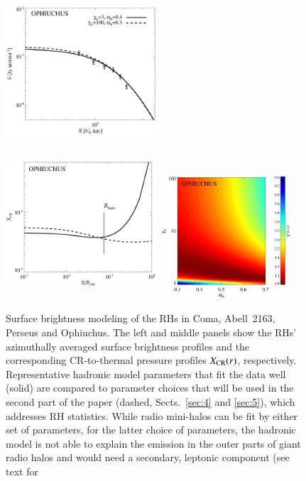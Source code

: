 \documentclass[useAMS,usenatbib]{mn2e}
\begin{document}
\begin{figure}
\includegraphics[width=5.6cm,height=5.6cm,keepaspectratio]{figures/SB_Ophiuchus.eps}
\includegraphics[width=5.6cm,height=5.6cm,keepaspectratio]{figures/XCR_Ophiuchus.eps}
\includegraphics[width=5cm,height=4.6cm]{figures/ProbOphiuchus.eps}
%
\caption{Surface brightness modeling of the RHs in Coma, Abell~2163, Perseus and
  Ophiuchus. The left and middle panels show the RHs' azimuthally averaged
  surface brightness profiles and the corresponding CR-to-thermal pressure
  profiles $X_{{\mathrm{CR}}}(r)$, respectively. Representative hadronic model
  parameters that fit the data well (solid) are compared to parameter choices
  that will be used in the second part of the paper (dashed, Sects.~\ref{sec:4}
  and \ref{sec:5}), which addresses RH statistics. While radio mini-halos can be
  fit by either set of parameters, for the latter choice of parameters, the
  hadronic model is not able to explain the emission in the outer parts of giant
  radio halos and would need a secondary, leptonic component (see text for
}
\end{figure}
\end{document}
